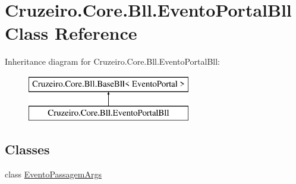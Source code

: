 \hypertarget{class_cruzeiro_1_1_core_1_1_bll_1_1_evento_portal_bll}{}\section{Cruzeiro.\+Core.\+Bll.\+Evento\+Portal\+Bll Class Reference}
\label{class_cruzeiro_1_1_core_1_1_bll_1_1_evento_portal_bll}
Inheritance diagram for Cruzeiro.\+Core.\+Bll.\+Evento\+Portal\+Bll\+:\begin{figure}[H]
\begin{center}
\leavevmode
\includegraphics[height=2.000000cm]{class_cruzeiro_1_1_core_1_1_bll_1_1_evento_portal_bll}
\end{center}
\end{figure}
\subsection*{Classes}
\begin{DoxyCompactItemize}
\item 
class \hyperlink{class_cruzeiro_1_1_core_1_1_bll_1_1_evento_portal_bll_1_1_evento_passagem_args}{Evento\+Passagem\+Args}
\end{DoxyCompactItemize}

